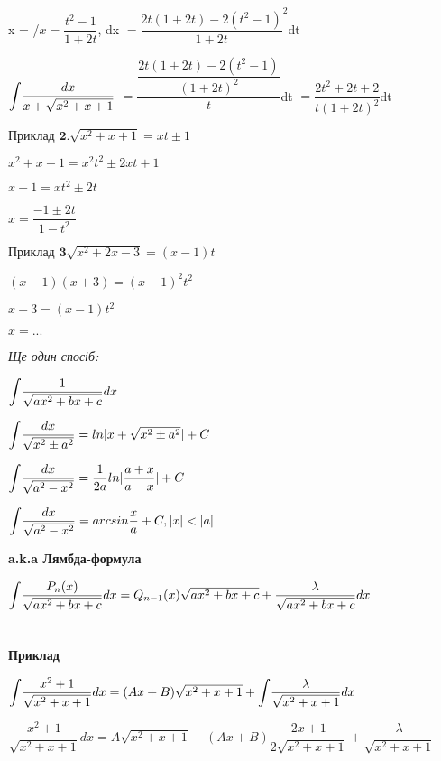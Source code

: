 \documentclass[12pt]{report}
\begin{document}
x = /$x = \dfrac{t^2 - 1}{1+2t}$, 
dx $= \dfrac {2t(1+2t)- 2(t^2- 1)}{1+2t}^2$dt

\vspace{3 mm}
$\mathlarger\int \dfrac{dx}{x + \sqrt{x^2+x+1}}$ $= \dfrac{\dfrac{2t(1+2t)-2(t^2 - 1)}{(1+2t)^2}}{t}$dt $= \dfrac{2t^2 +2t + 2}{t(1+2t)^2}$dt

\vspace{5 mm}
$\textbf{Приклад 2.} \sqrt{x^2+x+1} = xt \pm 1$

$x^2+x+1 = x^2t^2 \pm 2xt+ 1$

$ x+1 = xt^2 \pm 2t$

$ x = \dfrac{-1\pm2t}{1-t^2} $

\vspace{5 mm} 
$\textbf{Приклад 3} \sqrt{x^2 +2x-3} = (x-1)t$

$ (x-1)(x+3) = (x-1)^2t^2$

$ x+3 = (x-1)t^2 $

$ x = ... $

\vspace{5 mm}  
\textit{Ще один спосіб:}

\vspace{3 mm}  
$\mathlarger\int\dfrac{1}{\sqrt{ax^2+bx+c}} dx$ 

\vspace{3 mm} 
$\mathlarger\int\dfrac{dx}{\sqrt{x^2\pm a^2}}= ln|x+\sqrt {x^2\pm a^2}| +C$

\vspace{3 mm} 
$\mathlarger\int\dfrac{dx}{\sqrt{a^2 -  x^2}}= \dfrac{1}{2a} ln|\dfrac{a+x}{a-x}| + C$

\vspace{3 mm} 
$\mathlarger\int\dfrac{dx}{\sqrt{a^2 -  x^2}} = arcsin \dfrac{x}{a} + C, |x|<|a|$

\vspace{5 mm} 
\textbf{a.k.a Лямбда-формула}

\vspace{3 mm} 
$\mathlarger\int\dfrac{P_n(x)}{\sqrt{ax^2+bx+c}} dx = Q_{n-1}(x)\sqrt{ax^2+bx+c}+\dfrac{\lambda}{\sqrt{ax^2+bx+c}}dx$
\\ \\ \\

\textbf{Приклад}

\vspace{3 mm} 
$\mathlarger\int\dfrac{x^2+1}{\sqrt{x^2 +x+1}}dx = (Ax+B)\sqrt{x^2+x+1} + \mathlarger\int\dfrac{\lambda}{\sqrt{x^2+x+1}}dx$

\vspace{3 mm} 
$ \dfrac{x^2 +1} {\sqrt{x^2+x+1}}dx = A\sqrt{x^2+x+1}+ (Ax+B)\dfrac{2x+1}{2\sqrt{x^2+x+1}} + \dfrac{\lambda}{\sqrt{x^2+x+1}}$
\end{document}
